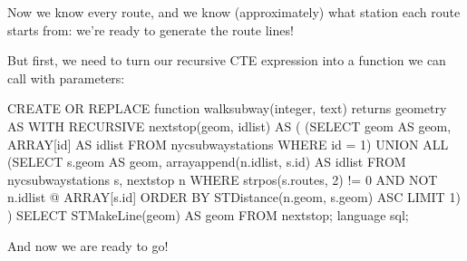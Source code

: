 \documentclass[a4paper,11pt,english]{sphinxmanual}
\begin{document}
Now we know every route, and we know (approximately) what station each route starts from: we’re ready to generate the route lines!

But first, we need to turn our recursive CTE expression into a function we can call with parameters:

\begin{sphinxVerbatim}[commandchars=\\\{\}]
CREATE OR REPLACE function walk\PYGZus{}subway(integer, text) returns geometry AS
\PYGZdl{}\PYGZdl{}
WITH RECURSIVE next\PYGZus{}stop(geom, idlist) AS (
    (SELECT
      geom AS geom,
      ARRAY[id] AS idlist
    FROM nyc\PYGZus{}subway\PYGZus{}stations
    WHERE id = \PYGZdl{}1)
    UNION ALL
    (SELECT
      s.geom AS geom,
      array\PYGZus{}append(n.idlist, s.id) AS idlist
    FROM nyc\PYGZus{}subway\PYGZus{}stations s, next\PYGZus{}stop n
    WHERE strpos(s.routes, \PYGZdl{}2) != 0
    AND NOT n.idlist @\PYGZgt{} ARRAY[s.id]
    ORDER BY ST\PYGZus{}Distance(n.geom, s.geom) ASC
    LIMIT 1)
)
SELECT ST\PYGZus{}MakeLine(geom) AS geom
FROM next\PYGZus{}stop;
\PYGZdl{}\PYGZdl{}
language \PYGZsq{}sql\PYGZsq{};
\end{sphinxVerbatim}

And now we are ready to go!
\end{document}
